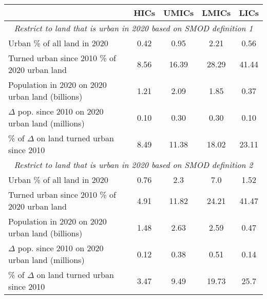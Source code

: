 
\begin{tabular}{lcccc}
\hline\hline
         & HICs & UMICs & LMICs & LICs \\
\hline
         \multicolumn{5}{c}{\it Restrict to land that is urban in 2020 based on SMOD definition 1}\\
\hline
     Urban \% of all land in 2020  & 0.42 & 0.95 & 2.21 & 0.56 \\
    Turned urban since 2010  \% of 2020 urban land & 8.56 & 16.39 & 28.29 & 41.44 \\
     Population in 2020 on 2020 urban land (billions)         & 1.21 & 2.09 & 1.85 & 0.37 \\
     $\Delta$ pop. since 2010 on 2020 urban land (millions) & 0.10   & 0.30  & 0.30  & 0.10 \\
     \% of $\Delta$ on land turned urban since 2010 & 8.49 & 11.38 & 18.02 & 23.11 \\
    \hline
         \multicolumn{5}{c}{\it Restrict to land that is urban in 2020 based on SMOD definition 2}\\
\hline
    Urban \% of all land in 2020  & 0.76 & 2.3 & 7.0 & 1.52 \\
    Turned urban since 2010  \% of 2020 urban land & 4.91 & 11.82 & 24.21 & 41.47 \\
     Population in 2020 on 2020 urban land (billions)         & 1.48 & 2.63 & 2.59 & 0.47 \\
     $\Delta$ pop. since 2010 on 2020 urban land (millions) & 0.12   & 0.38  & 0.51  & 0.14 \\
     \% of $\Delta$ on land turned urban since 2010 & 3.47 & 9.49 & 19.73 & 25.7\\
         \hline\hline
\end{tabular}
